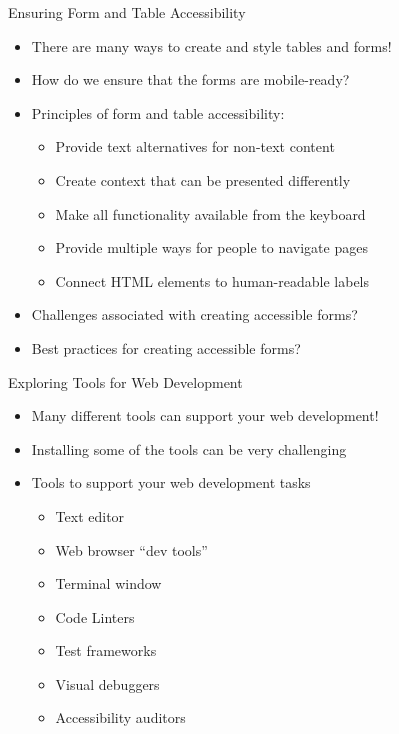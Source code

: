\documentclass[14pt,aspectratio=169]{beamer}
\begin{document}
%
\begin{frame}{Ensuring Form and Table Accessibility}
  \begin{itemize}
    \item There are many ways to create and style tables and forms!
      \vspace*{-.2in}
    \item How do we ensure that the forms are mobile-ready?
      \vspace*{-.2in}
    \item Principles of form and table accessibility:
      \begin{itemize}
        \item Provide text alternatives for non-text content
        \item Create context that can be presented differently
        \item Make all functionality available from the keyboard
        \item Provide multiple ways for people to navigate pages
        \item Connect HTML elements to human-readable labels
      \end{itemize}
      \vspace*{-.25in}
    \item Challenges associated with creating accessible forms?
      \vspace*{-.25in}
    \item Best practices for creating accessible forms?
  \end{itemize}
\end{frame}

%
\begin{frame}{Exploring Tools for Web Development}
%
  \begin{itemize}
    \item Many different tools can support your web development!
      \vspace*{-.2in}
    \item Installing some of the tools can be very challenging
      \vspace*{-.15in}
    \item Tools to support your web development tasks
      \begin{itemize}
        \item Text editor
        \item Web browser ``dev tools''
        \item Terminal window
        \item Code Linters
        \item Test frameworks
        \item Visual debuggers
        \item Accessibility auditors
      \end{itemize}
  \end{itemize}
%
\end{frame}
\end{document}
